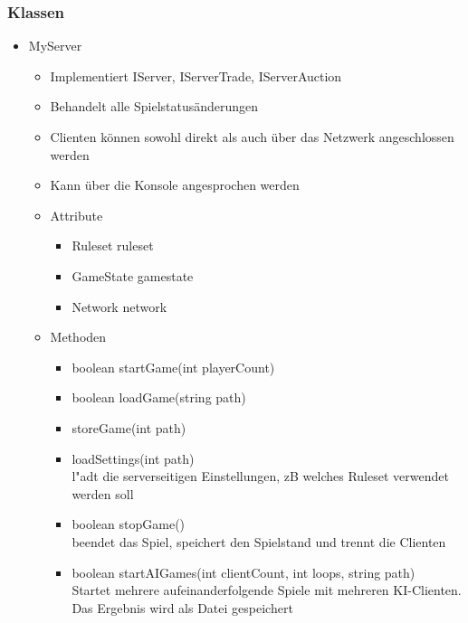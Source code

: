 \documentclass[a4paper,10pt]{article}
\begin{document}
\subsubsection{Klassen}
\begin{itemize}
\item MyServer 
\begin{itemize}
\item Implementiert IServer, IServerTrade, IServerAuction
\item Behandelt alle Spielstatusänderungen
\item Clienten können sowohl direkt als auch über das Netzwerk angeschlossen werden
\item Kann über die Konsole angesprochen werden
\item Attribute
\begin{itemize}
\item Ruleset ruleset
\item GameState gamestate
\item Network network
\end{itemize}
\item Methoden
\begin{itemize}
\item boolean startGame(int playerCount) 
\item boolean loadGame(string path)
\item storeGame(int path)
\item loadSettings(int path)
\\l"adt die serverseitigen Einstellungen, zB welches Ruleset verwendet werden soll
\item boolean stopGame()
\\beendet das Spiel, speichert den Spielstand und trennt die Clienten
\item boolean startAIGames(int clientCount, int loops, string path)
\\Startet mehrere aufeinanderfolgende Spiele mit mehreren KI-Clienten. Das Ergebnis wird als Datei gespeichert
\end{itemize}
\end{itemize}
\end{itemize}
\end{document}
